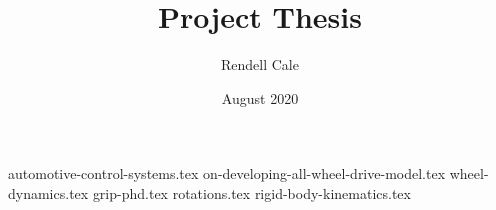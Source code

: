 \documentclass{article}
\title{Project Thesis}
\author{Rendell Cale}
\date{August 2020}
\begin{document}
\maketitle

{automotive-control-systems.tex}
{on-developing-all-wheel-drive-model.tex}
{wheel-dynamics.tex}
{grip-phd.tex}
{rotations.tex}
{rigid-body-kinematics.tex}

\printbibliography
\end{document}
